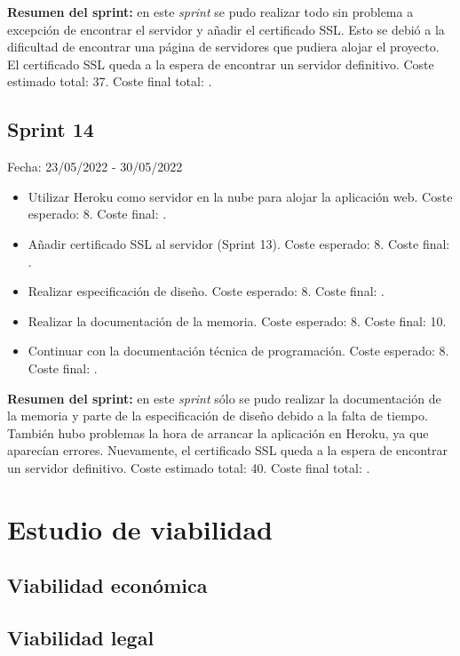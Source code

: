 \textbf{Resumen del sprint:} en este \textit{sprint} se pudo realizar todo sin problema a excepción de encontrar el servidor y añadir el certificado SSL. Esto se debió a la dificultad de encontrar una página de servidores que pudiera alojar el proyecto. El certificado SSL queda a la espera de encontrar un servidor definitivo. Coste estimado total: 37. Coste final total: .

\subsection{Sprint 14}
Fecha: 23/05/2022 - 30/05/2022
\begin{itemize}
	\item Utilizar Heroku como servidor en la nube para alojar la aplicación web. Coste esperado: 8. Coste final: .
	\item Añadir certificado SSL al servidor (Sprint 13). Coste esperado: 8. Coste final: .
	\item Realizar especificación de diseño. Coste esperado: 8. Coste final: .
	\item Realizar la documentación de la memoria. Coste esperado: 8. Coste final: 10.
	\item Continuar con la documentación técnica de programación. Coste esperado: 8. Coste final: .
\end{itemize}

\textbf{Resumen del sprint:} en este \textit{sprint} sólo se pudo realizar la documentación de la memoria y parte de la especificación de diseño debido a la falta de tiempo. También hubo problemas la hora de arrancar la aplicación en Heroku, ya que aparecían errores. Nuevamente, el certificado SSL queda a la espera de encontrar un servidor definitivo. Coste estimado total: 40. Coste final total: .

\section{Estudio de viabilidad}

\subsection{Viabilidad económica}

\subsection{Viabilidad legal}
